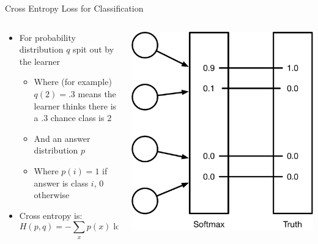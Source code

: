 \documentclass[aspectratio=169]{beamer}
\begin{document}
\begin{frame}{Cross Entropy Loss for Classification}

\begin{columns}
\begin{column}{0.5\textwidth}
\begin{itemize}
\item For probability distribution $q$ spit out by the learner
	\begin{itemize}
        \item Where (for example) $q(2) = .3$ means the learner thinks there is a $.3$ chance class is $2$
	\item And an answer distribution $p$
	\item Where $p(i) = 1$ if answer is class $i$, $0$ otherwise
	\end{itemize}
\item Cross entropy is:
$$H(p, q) = -\sum_x p(x) \log q (x)$$
\end{itemize}
\end{column}
\begin{column}{0.5\textwidth}
\includegraphics[width=1\textwidth]{lectTF/crossEntropy.pdf}
\end{column}
\end{columns}

\end{frame}
\end{document}
